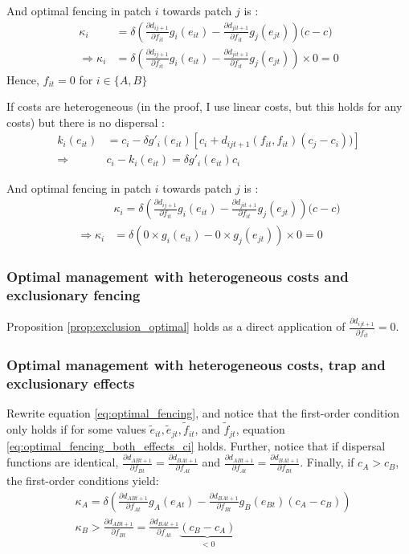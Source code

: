 And optimal fencing in patch $i$ towards patch $j$ is : 
\begin{align*}
\kappa_i & = \delta\left(\frac{\partial d_{ij+1}}{\partial f_{it}} g_i(e_{it}) - \frac{\partial d_{jit+1}}{\partial f_{it}}g_j(e_{jt})\right) \big(c - c\big)\\
\Rightarrow \kappa_i & = \delta\left(\frac{\partial d_{ij+1}}{\partial f_{it}} g_i(e_{it}) - \frac{\partial d_{jit+1}}{\partial f_{it}}g_j(e_{jt})\right)\times 0 = 0
\end{align*}
Hence, $f_{it}= 0$ for $i \in \{A, B\}$

If costs are heterogeneous (in the proof, I use linear costs, but this holds for any costs) but there is no dispersal : 
\begin{align*}
k_i(e_{it})& = c_i - \delta g'_i(e_{it})\left[c_i + d_{ijt+1}(f_{it}, f_{it})(c_j - c_i)) \right]\\
\Rightarrow & c_i - k_i(e_{it}) = \delta g'_i(e_{it}) c_i
\end{align*}

And optimal fencing in patch $i$ towards patch $j$ is : 
\begin{align*}
&\kappa_i = \delta\left(\frac{\partial d_{ij+1}}{\partial f_{it}} g_i(e_{it}) - \frac{\partial d_{jit+1}}{\partial f_{it}}g_j(e_{jt})\right) \big(c - c\big)\\
\Rightarrow \kappa_i& = \delta\left(0 \times g_i(e_{it}) - 0 \times g_j(e_{jt})\right)\times 0 = 0
\end{align*}

\subsubsection{Optimal management with heterogeneous costs and exclusionary fencing}
Proposition \ref{prop:exclusion_optimal} holds as a direct application of $\frac{\partial d_{ijt+1}}{\partial f_{it}}=0$.

\subsubsection{Optimal management with heterogeneous costs, trap and exclusionary effects}
\label{appendix:heterogenous_cost_trap_exclusion}
Rewrite equation \ref{eq:optimal_fencing}, and notice that the first-order condition only holds if for some values $\tilde{e}_{it}, \tilde{e}_{jt}, \tilde{f}_{it}$, and $\tilde{f}_{jt}$, equation \ref{eq:optimal_fencing_both_effects_ci} holds. Further, notice that if dispersal functions are identical, $\frac{\partial d_{ABt+1}}{\partial f_{Bt}} = \frac{\partial d_{BAt+1}}{\partial f_{At}}$ and $\frac{\partial d_{ABt+1}}{\partial f_{At}} = \frac{\partial d_{BAt+1}}{\partial f_{Bt}}$. Finally, if $c_A>c_B$, the first-order conditions yield: 
\begin{align*}
&\kappa_A = \delta \left( \frac{\partial d_{ABt+1}}{\partial f_{At}} g_A(e_{At}) - \frac{\partial d_{BAt+1}}{\partial f_{Bt}} g_B(e_{Bt}) (c_A - c_B) \right) \\
&\kappa_B > \frac{\partial d_{ABt+1}}{\partial f_{Bt}} = \frac{\partial d_{BAt+1}}{\partial f_{At}} \underbrace{(c_B - c_A)}_{<0}
\end{align*}

